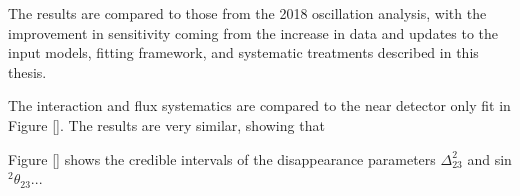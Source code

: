 The results are compared to those from the 2018 oscillation analysis, with the improvement in sensitivity coming from the increase in data and updates to the input models, fitting framework, and systematic treatments described in this thesis. 

The interaction and flux systematics are compared to the near detector only fit in Figure \ref{}. The results are very similar, showing that 

Figure \ref{} shows the credible intervals of the disappearance parameters $\Delta^{2}_{23}$ and sin$^{2}\theta_{23}$...



\newpage
